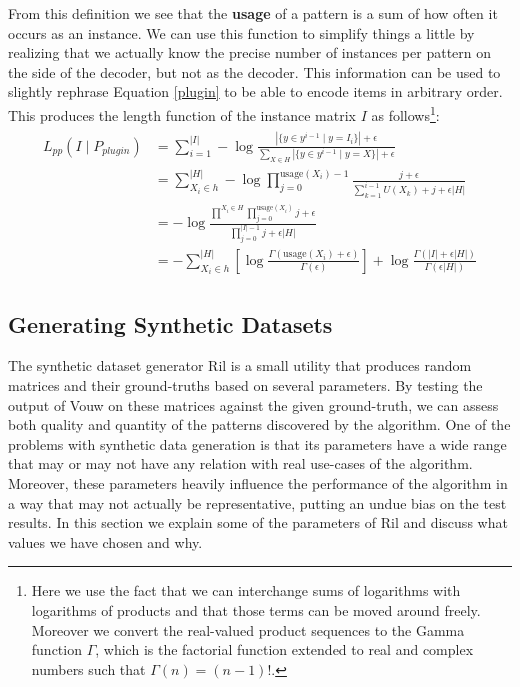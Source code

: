 \documentclass{llncs}
\begin{document}
From this definition we see that the \textbf{usage} of a pattern is a sum of how often it occurs as an instance. We can use this function to simplify things a little by realizing that we actually know the precise number of instances per pattern on the side of the decoder, but not as the decoder. This information can be used to slightly rephrase Equation \ref{plugin} to be able to encode items in arbitrary order. This produces the length function of the instance matrix ${I}$ as follows\footnote{Here we use the fact that we can interchange sums of logarithms with logarithms of products and that those terms can be moved around freely. Moreover we convert the real-valued product sequences to the Gamma function $\Gamma$, which is the factorial function extended to real and complex numbers such that $\Gamma(n) = (n-1)!$.}:
\begin{align}
\begin{split}
	L_{pp}({I}\mid P_{plugin}) &= \sum^{|{I}|}_{i=1} -\log \frac{|\{y \in y^{i-1} \mid y = {I}_i\}| + \epsilon }{\sum_{X \in H}|\{y \in y^{i-1} \mid y = X\}| + \epsilon}\\
	&= \sum^{|H|}_{X_i \in h} -\log \prod^{\mathrm{usage}(X_i)-1}_{j=0} \frac{j+\epsilon}{\sum^{i-1}_{k=1} U(X_k)+j+\epsilon|H|} \\
	&= -\log \frac{\prod^{X_i\in H} \prod^{\mathrm{usage}(X_i)}_{j=0} j + \epsilon}{\prod^{|{I}|-1}_{j=0} j + \epsilon|H|} \\
	&= -\sum^{|H|}_{X_i \in h} \left[ \log \frac{\Gamma(\mathrm{usage}(X_i)+\epsilon)}{\Gamma(\epsilon)}\right] + \log \frac{\Gamma(|{I}| + \epsilon|H|)}{\Gamma(\epsilon|H|)}
\end{split}
\end{align}


\subsection{Generating Synthetic Datasets}

The synthetic dataset generator Ril is a small utility that produces random matrices and their ground-truths based on several parameters. By testing the output of Vouw on these matrices against the given ground-truth, we can assess both quality and quantity of the patterns discovered by the algorithm. One of the problems with synthetic data generation is that its parameters have a wide range that may or may not have any relation with real use-cases of the algorithm. Moreover, these parameters heavily influence the performance of the algorithm in a way that may not actually be representative, putting an undue bias on the test results. In this section we explain some of the parameters of Ril and discuss what values we have chosen and why.
\end{document}
